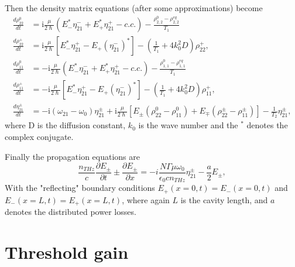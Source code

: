 \documentclass[preprint,secnumarabic,amssymb, nobibnotes, aip, prd]{revtex4-1}
\begin{document}
Then the density matrix equations (after some approximations) become 
\begin{align}
\frac{d\rho_{22}^{0}}{dt} &= \mathrm{i}\frac{\mu}{2\hslash}\left(  E_{-}^{\ast}\eta_{21}^{-}+E_{+}^{\ast}\eta_{21}^{+}-c.c.\right) -\frac{\rho_{2,2}^{0}-\rho_{2,2}^{eq}}{T_1} \\
\frac{d\rho_{22}^{+}}{dt} &= \mathrm{i}\frac{\mu}{2\hslash}\left[  E_{-}^{\ast}\eta_{21}^{+}-E_{+}(\eta_{21}^{-})^{\ast}\right] - \left( \frac{1}{T_1}+4k_{0}^{2}D\right)  \rho_{22}^{+},\label{eq:rtpop3grating}\\
\frac{d\rho_{11}^{0}}{dt} &=-\mathrm{i}\frac{\mu}{2\hslash}\left(E_{-}^{\ast}\eta_{21}^{-}+E_{+}^{\ast}\eta_{21}^{+}-c.c.\right) -\frac{\rho_{1,1}^{0}-\rho_{1,1}^{eq}}{T_1} \\
\frac{d\rho_{11}^{+}}{dt} &=-\mathrm{i}\frac{\mu}{2\hslash}\left[E_{-}^{\ast}\eta_{21}^{+}-E_{+}(\eta_{21}^{-})^{\ast}\right] -\left(  \frac{1}{T_1}+4k_{0}^{2}D\right) \rho_{11}^{+}, \label{eq:rtpop2grating} \\
\frac{d\eta_{21}^{\pm}}{dt} & = -\mathrm{i}\left(  \omega_{21}-\omega_{0}\right) \eta_{21}^{\pm}+\mathrm{i}\frac{\mu}{2\hslash}\left[  E_{\pm}(\rho_{22}^{0}-\rho_{11}^{0})+E_{\mp}(\rho_{22}^{\pm}-\rho_{11}^{\pm})\right]-\frac{1}{T_2}\eta_{21}^{\pm},
\end{align}
where D is the diffusion constant, $k_0$ is the wave number and the $^{\ast}$ denotes the complex conjugate.

Finally the propagation equations are
\begin{equation}
\frac{n_{THz}}{c}\frac{\partial E_{\pm}}{\partial {t}}\pm\frac{\partial E_{\pm}}{\partial {x}}=-i\frac{N\Gamma\mu\omega_0}{\epsilon_0 c n_{THz}}\eta_{21}^{\pm}-\frac{a}{2}E_{\pm
}, \label{eq:rtwave}%
\end{equation}	
With the "reflecting" boundary conditions $E_+(x=0,t)=E_-(x=0,t)$ and $E_-(x=L,t)=E_+(x=L,t)$, where again $L$ is the cavity length, and $a$ denotes the distributed power losses. 


\section{Threshold gain}
\end{document}
